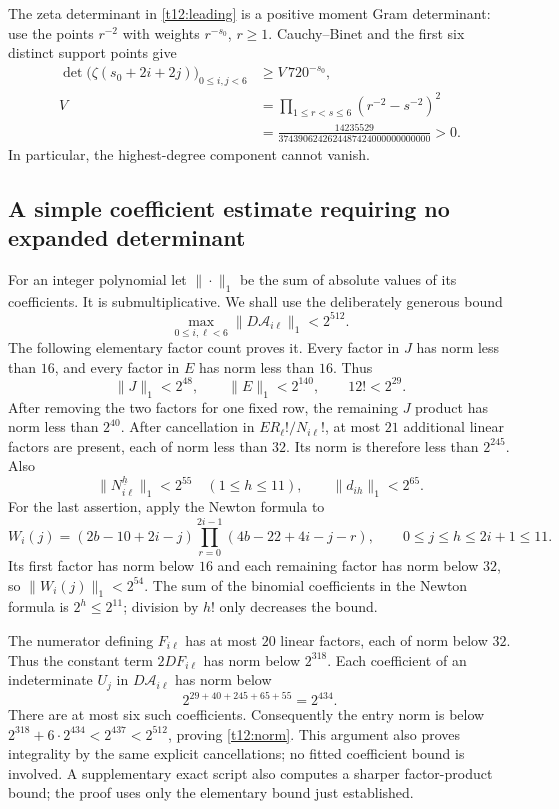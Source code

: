 The zeta determinant in \eqref{t12:leading} is a positive moment
Gram determinant: use the points $r^{-2}$ with weights $r^{-s_0}$,
$r\ge1$. Cauchy--Binet and the first six distinct support points give
\begin{equation}\label{t12:zeta-lower}
 \begin{aligned}
 \det\bigl(\zeta(s_0+2i+2j)\bigr)_{0\le i,j<6}
 &\ge V\,720^{-s_0},\\
 V&=\prod_{1\le r<s\le6}(r^{-2}-s^{-2})^2\\
 &=\frac{14235529}{3743906242624487424000000000000}>0.
 \end{aligned}
\end{equation}
In particular, the highest-degree component cannot vanish.

\subsection{A simple coefficient estimate requiring no expanded determinant}

For an integer polynomial let $\|\cdot\|_1$ be the sum of absolute
values of its coefficients. It is submultiplicative. We shall use
the deliberately generous bound
\begin{equation}\label{t12:norm}
 \max_{0\le i,\ell<6}\|D\mathcal A_{i\ell}\|_1<2^{512}.
\end{equation}
The following elementary factor count proves it.
Every factor in $J$ has norm less than $16$, and every factor in $E$
has norm less than $16$. Thus
\[
 \|J\|_1<2^{48},\qquad\|E\|_1<2^{140},\qquad12!<2^{29}.
\]
After removing the two factors for one fixed row, the remaining
$J$ product has norm less than $2^{40}$. After cancellation in
$ER_\ell!/N_{i\ell}!$, at most $21$ additional linear factors are
present, each of norm less than $32$. Its norm is therefore less
than $2^{245}$. Also
\[
 \|N_{i\ell}^{\underline h}\|_1<2^{55}
 \quad(1\le h\le11),\qquad
 \|d_{ih}\|_1<2^{65}.
\]
For the last assertion, apply the Newton formula to
\[
 W_i(j)=(2b-10+2i-j)
             \prod_{r=0}^{2i-1}(4b-22+4i-j-r),
 \qquad0\le j\le h\le2i+1\le11.
\]
Its first factor has norm below $16$ and each remaining factor
has norm below $32$, so $\|W_i(j)\|_1<2^{54}$. The sum of the
binomial coefficients in the Newton formula is $2^h\le2^{11}$;
division by $h!$ only decreases the bound.

The numerator defining $F_{i\ell}$ has at most $20$ linear factors,
each of norm below $32$. Thus the constant term $2DF_{i\ell}$ has
norm below $2^{318}$. Each coefficient of an indeterminate $U_j$
in $D\mathcal A_{i\ell}$ has norm below
\[
 2^{29+40+245+65+55}=2^{434}.
\]
There are at most six such coefficients. Consequently the entry norm
is below $2^{318}+6\cdot2^{434}<2^{437}<2^{512}$, proving
\eqref{t12:norm}. This argument also proves integrality by the same
explicit cancellations; no fitted coefficient bound is involved.
A supplementary exact script also computes a sharper factor-product
bound; the proof uses only the elementary bound just established.

